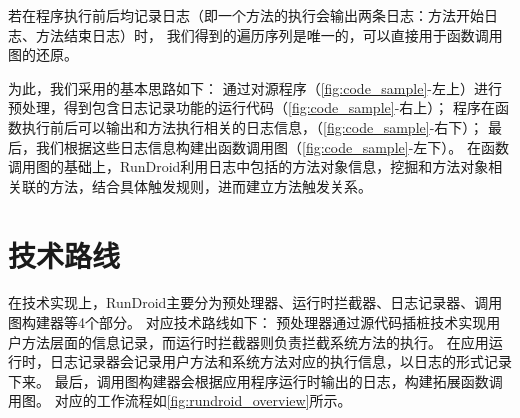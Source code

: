 若在程序执行前后均记录日志（即一个方法的执行会输出两条日志：方法开始日志、方法结束日志）时，
我们得到的遍历序列是唯一的，可以直接用于函数调用图的还原。

为此，我们采用的基本思路如下：
通过对源程序（\autoref{fig:code_sample}-左上）进行预处理，得到包含日志记录功能的运行代码（\autoref{fig:code_sample}-右上）；
程序在函数执行前后可以输出和方法执行相关的日志信息，（\autoref{fig:code_sample}-右下）；
最后，我们根据这些日志信息构建出函数调用图（\autoref{fig:code_sample}-左下）。
在函数调用图的基础上，RunDroid利用日志中包括的方法对象信息，挖掘和方法对象相关联的方法，结合具体触发规则，进而建立方法触发关系。




\section{技术路线}

在技术实现上，RunDroid主要分为预处理器、运行时拦截器、日志记录器、调用图构建器等4个部分。
对应技术路线如下：
预处理器通过源代码插桩技术实现用户方法层面的信息记录，而运行时拦截器则负责拦截系统方法的执行。
在应用运行时，日志记录器会记录用户方法和系统方法对应的执行信息，以日志的形式记录下来。
最后，调用图构建器会根据应用程序运行时输出的日志，构建拓展函数调用图。
对应的工作流程如\autoref{fig:rundroid_overview}所示。




